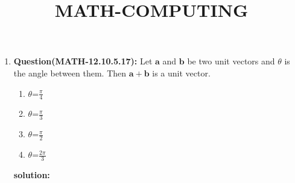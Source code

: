\documentclass[12pt,-letter paper]{article}
\let\vec\mathbf{}
\let\vec\mathbf{}
\let\vec\mathbf{}
\begin{document}
\title{\textbf{MATH-COMPUTING}}
\maketitle
\begin{enumerate}
 
    \item \textbf{Question(MATH-12.10.5.17):}
       Let $\vec{a}$ and $\vec{b}$ be two unit vectors and $\theta$ is the angle between them. Then $\vec{a}+\vec{b}$ is a unit vector.
    
 \begin{enumerate}[label=(\Alph*)]                     
 \item $\theta$=$\frac{\pi}{4}$
 \item $\theta$=$\frac{\pi}{3}$
  \item $\theta$=$\frac{\pi}{2}$
   \item $\theta$=$\frac{2\pi}{3}$
   \end{enumerate}

 \textbf{solution:}


\end{enumerate}
\end{document}
